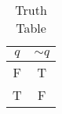 \begin{table}[ht]
\caption{Truth Table}
\centering
\begin{tabular}{|c||c|}
\hline
$ q $ & $  \sim q $ \\
\hline
F & T \\
T & F \\
\hline
\end{tabular}
\label{table:tt1}
\end{table}
